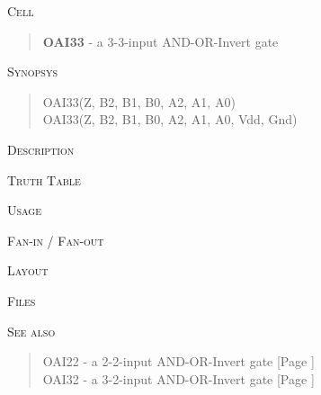 
\label{OAI33}
\textsc{Cell}
\begin{quote}
    \textbf{OAI33} - a 3-3-input AND-OR-Invert gate
\end{quote}

\textsc{Synopsys}
\begin{quote}
    OAI33(Z, B2, B1, B0, A2, A1, A0) \\
    OAI33(Z, B2, B1, B0, A2, A1, A0, Vdd, Gnd)
\end{quote}

\textsc{Description}

%

\textsc{Truth Table}


\textsc{Usage}

\textsc{Fan-in / Fan-out}

\textsc{Layout}

\textsc{Files}

\textsc{See also}
\begin{quote}
    OAI22 - a 2-2-input AND-OR-Invert gate [Page \pageref{OAI22}] \\
    OAI32 - a 3-2-input AND-OR-Invert gate [Page \pageref{OAI32}]
\end{quote}

